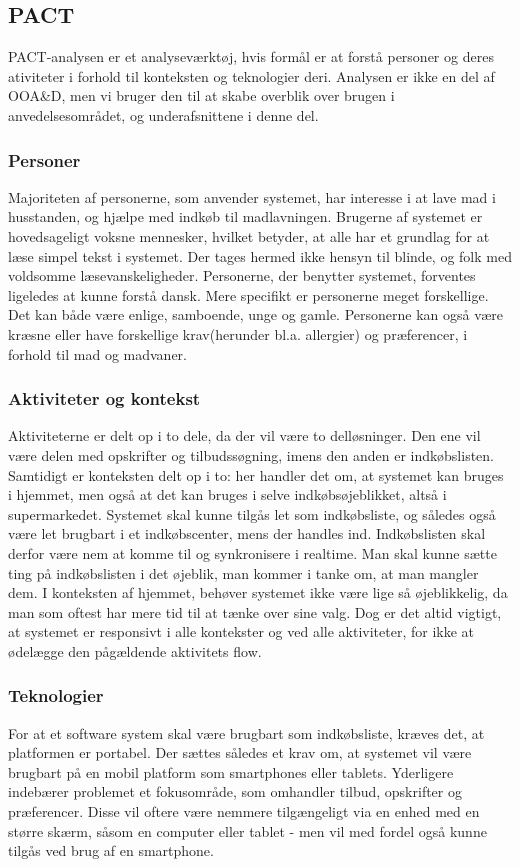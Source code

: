 \subsection{PACT}
PACT-analysen er et analyseværktøj, hvis formål er at forstå personer og deres ativiteter i forhold til konteksten og teknologier deri\citep{DIS2014}.
Analysen er ikke en del af OOA\&D, men vi bruger den til at skabe overblik over brugen i anvedelsesområdet, og underafsnittene i denne del.

\subsubsection{Personer}
Majoriteten af personerne, som anvender systemet, har interesse i at lave mad i husstanden, og hjælpe med indkøb til madlavningen.
Brugerne af systemet er hovedsageligt voksne mennesker, hvilket betyder, at alle har et grundlag for at læse simpel tekst i systemet.
Der tages hermed ikke hensyn til blinde, og folk med voldsomme læsevanskeligheder.
Personerne, der benytter systemet, forventes ligeledes at kunne forstå dansk.
Mere specifikt er personerne meget forskellige.
Det kan både være enlige, samboende, unge og gamle.
Personerne kan også være kræsne eller have forskellige krav(herunder bl.a. allergier) og præferencer, i forhold til mad og madvaner.

\subsubsection{Aktiviteter og kontekst}
Aktiviteterne er delt op i to dele, da der vil være to delløsninger.
Den ene vil være delen med opskrifter og tilbudssøgning, imens den anden er indkøbslisten.
Samtidigt er konteksten delt op i to: her handler det om, at systemet kan bruges i hjemmet, men også at det kan bruges i selve indkøbsøjeblikket, altså i supermarkedet.
Systemet skal kunne tilgås let som indkøbsliste, og således også være let brugbart i et indkøbscenter, mens der handles ind.
Indkøbslisten skal derfor være nem at komme til og synkronisere i realtime.
Man skal kunne sætte ting på indkøbslisten i det øjeblik, man kommer i tanke om, at man mangler dem.
I konteksten af hjemmet, behøver systemet ikke være lige så øjeblikkelig, da man som oftest har mere tid til at tænke over sine valg.
Dog er det altid vigtigt, at systemet er responsivt i alle kontekster og ved alle aktiviteter, for ikke at ødelægge den pågældende aktivitets flow.

\subsubsection{Teknologier}
For at et software system skal være brugbart som indkøbsliste, kræves det, at platformen er portabel.
Der sættes således et krav om, at systemet vil være brugbart på en mobil platform som smartphones eller tablets.
Yderligere indebærer problemet et fokusområde, som omhandler tilbud, opskrifter og præferencer.
Disse vil oftere være nemmere tilgængeligt via en enhed med en større skærm, såsom en computer eller tablet - men vil med fordel også kunne tilgås ved brug af en smartphone.
